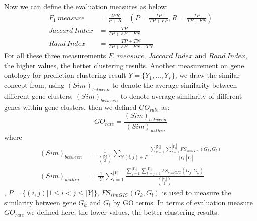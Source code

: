 \documentclass{bmcart}
\begin{document}
Now we can define the evaluation measures as below:
\begin{equation}\label{}\nonumber
\begin{split}
F_{1}\ measure&=\frac{2PR}{P+R}\quad(P=\frac{TP}{TP+FP},  R=\frac{TP}{TP+FN}) \\
Jaccard\ Index&=\frac{TP}{TP+FP+FN}\\
Rand\ Index&=\frac{TP+TN}{TP+FP+FN+TN}
\end{split}
\end{equation}
For all these three measurements $F_1\ measure$, $Jaccard\ Index$ and $Rand\ Index$, the higher values, the better clustering results.
Another measurement on gene ontology for prediction clustering result $Y=\{Y_1,...,Y_s\}$, we draw the similar concept from\cite{Wei2006}, using  $(Sim)_{between}$ to denote the average similarity between different gene clusters, $(Sim)_{between}$ to denote average similarity of different genes within gene clusters. then we defined $GO_{rate}$ as:
$$
GO_{rate} = \frac{(Sim)_{between}}{(Sim)_{within}}
$$
where
\begin{equation}\label{}\nonumber
\begin{split}
(Sim)_{between}&=\frac{1}{{|Y|\choose 2}}\sum_{\forall(i,j)\in P}
\frac{\sum_{k=1}^{|Y_i|}\sum_{l=1}^{|Y_j|}FS_{simGIC}(G_k,G_l)}{|Y_i||Y_j|}\\
(Sim)_{within}&=\frac{1}{|Y|}\sum_{i=1}^{|Y|}
\frac{\sum_{j=1}^{|Y_i|}\sum_{k=j+1}^{|Y_i|}FS_{simGIC}(G_j,G_k)}{{|Y_i|\choose 2}}
\end{split}
\end{equation}
,
$P=\{(i,j)|1\leq i< j\leq|Y|\}$, $FS_{simGIC}(G_k,G_l)$ \cite{Teng2013} is used to measure the similarity between gene $G_k$ and $G_l$ by GO terms. In terms of evaluation measure $GO_{rate}$ we defined here, the lower values, the better clustering results.
\end{document}
